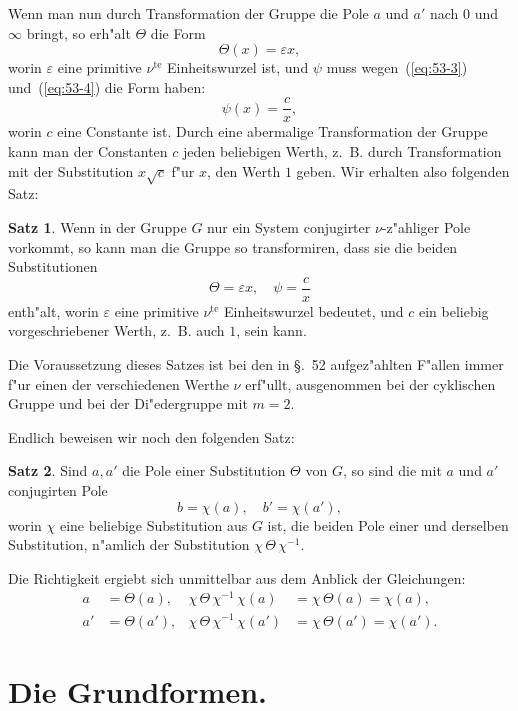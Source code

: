 \documentclass[12pt,a4paper]{article}
\theoremstyle{definition}
\newtheorem*{satz}{Satz}
\begin{document}
Wenn man nun durch Transformation der Gruppe die Pole $a$ und $a'$ nach $0$ und $\infty$ bringt, so erh"alt $\Theta$ die Form
\[
\Theta(x) = \varepsilon x,
\]
worin $\varepsilon$ eine primitive $\nu^{\text{te}}$ Einheitswurzel ist, und $\psi$ muss wegen~(\ref{eq:53-3}) und~(\ref{eq:53-4}) die Form haben:
\[
\psi(x) = \frac{c}{x},
\]
worin $c$ eine Constante ist. Durch eine abermalige Transformation der Gruppe kann man der Constanten $c$ jeden beliebigen Werth, z.~B. durch Transformation mit der Substitution $x\sqrt{c}$ f"ur $x$, den Werth $1$ geben. Wir erhalten also folgenden Satz:

\begin{satz}
Wenn in der Gruppe $G$ nur ein System conjugirter $\nu$-z"ahliger Pole vorkommt, so kann man die Gruppe so transformiren, dass sie die beiden Substitutionen
\[
\Theta = \varepsilon x, \quad \psi = \frac{c}{x}
\]
enth"alt, worin $\varepsilon$ eine primitive $\nu^{\text{te}}$ Einheitswurzel bedeutet, und $c$ ein beliebig vorgeschriebener Werth, z.~B. auch $1$, sein kann.
\end{satz}

Die Voraussetzung dieses Satzes ist bei den in \S.~52 aufgez"ahlten F"allen immer f"ur einen der verschiedenen Werthe $\nu$ erf"ullt, ausgenommen bei der cyklischen Gruppe und bei der Di"edergruppe mit $m = 2$.

Endlich beweisen wir noch den folgenden Satz:

\begin{satz}
Sind $a, a'$ die Pole einer Substitution $\Theta$ von $G$, so sind die mit $a$ und $a'$ conjugirten Pole
\[
b = \chi(a), \quad b' = \chi(a'),
\]
worin $\chi$ eine beliebige Substitution aus $G$ ist, die beiden Pole einer und derselben Substitution, n"amlich der Substitution $\chi\,\Theta\,\chi^{-1}$.
\end{satz}

Die Richtigkeit ergiebt sich unmittelbar aus dem Anblick der Gleichungen:
\begin{align*}
a &= \Theta(a), & \chi\,\Theta\,\chi^{-1}\,\chi(a) &= \chi\,\Theta(a) = \chi(a), \\
a' &= \Theta(a'), & \chi\,\Theta\,\chi^{-1}\,\chi(a') &= \chi\,\Theta(a') = \chi(a').
\end{align*}


\section{Die Grundformen.}\label{sec:54}
\end{document}
